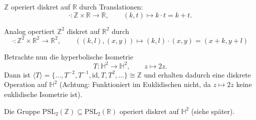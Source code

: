 \documentclass[11pt]{book}
\numberwithin{dummy}{section}
\theoremstyle{nonumberbreak}
\newenvironment{ex}[1][]{\ifthenelse{\equal{#1}{}}{\example}{\example[#1]}\rm}{\endexample}
\newcommand{\Z}{\mathbb{Z}}
\newcommand{\R}{\mathbb{R}}
\newcommand{\He}{\mathbb{H}}
\newcommand{\la}{\longrightarrow}
\newcommand{\id}{\mathrm{id}}
\begin{document}
\begin{spacing}{1.4}
\begin{ex}
\begin{compactenum}
\item $\Z$ operiert diskret auf $\R$ durch Translationen:
$$\cdot: \Z \times \R \la \R, \qquad (k,t) \mapsto k\cdot t = k+t.$$
\item Analog opertiert $\Z^2$ diskret auf $\R^2$ durch 
$$\cdot: \Z^2 \times \R^2 \la \R^2, \qquad ((k,l),(x,y)) \mapsto (k,l) \cdot (x,y) = (x+k,y+l)$$
\item Betrachte nun die hyperbolische Isometrie
$$T: \He^2 \la \He^2, \qquad z \mapsto 2z.$$
Dann ist $\langle T \rangle = \{ \ldots, T^{-2}, T^{-1}, \id, T, T^2, \ldots \} \cong \mathbb{Z}$ und erhalten dadurch eine diskrete Operation auf $\He^2$ (Achtung: Funktioniert im Euklidischen nicht, da $z \mapsto 2z$ keine euklidische Isometrie ist).
\item Die Gruppe $\mathrm{PSL}_2(\Z) \subseteq \mathrm{PSL}_2(\R)$ operiert diskret auf $\He^2$ (siehe später).


\end{compactenum}
\end{ex}




\end{spacing}
\end{document}
